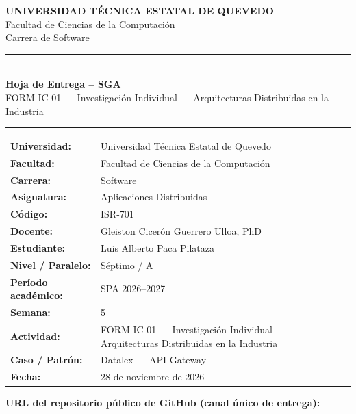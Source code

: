 \documentclass[11pt,a4paper]{article}
\begin{document}
\vspace*{1.0cm}

\begin{center}
  {\Large \textbf{UNIVERSIDAD T\'ECNICA ESTATAL DE QUEVEDO}}\\[0.2cm]
  {\large Facultad de Ciencias de la Computaci\'on}\\[0.15cm]
  {\large Carrera de Software}\\[0.8cm]
  \rule{\textwidth}{0.8pt}\\[0.4cm]
  {\LARGE \textbf{Hoja de Entrega -- SGA}}\\[0.2cm]
  {\large FORM-IC-01 --- Investigaci\'on Individual --- Arquitecturas Distribuidas en la Industria}\\[0.2cm]
  \rule{\textwidth}{0.8pt}
\end{center}

\vspace{0.8cm}

\begin{center}
\renewcommand{\arraystretch}{1.32}
\begin{tabular}{@{}p{4.8cm}p{11.6cm}@{}}
  \toprule
  \textbf{Universidad:}           & Universidad T\'ecnica Estatal de Quevedo \\
  \textbf{Facultad:}              & Facultad de Ciencias de la Computaci\'on \\
  \textbf{Carrera:}               & Software \\
  \textbf{Asignatura:}            & Aplicaciones Distribuidas \\
  \textbf{C\'odigo:}              & ISR-701 \\
  \textbf{Docente:}               & Gleiston Cicer\'on Guerrero Ulloa, PhD \\
  \textbf{Estudiante:}            & Luis Alberto Paca Pilataza \\
  \textbf{Nivel / Paralelo:}      & S\'eptimo / A \\
  \textbf{Per\'iodo acad\'emico:} & SPA 2026--2027 \\
  \textbf{Semana:}                & 5 \\
  \textbf{Actividad:}             & FORM-IC-01 --- Investigaci\'on Individual --- Arquitecturas Distribuidas en la Industria \\
  \textbf{Caso / Patr\'on:}       & Datalex --- API Gateway \\
  \textbf{Fecha:}                 & 28 de noviembre de 2026 \\
  \bottomrule
\end{tabular}
\end{center}

\vspace{0.9cm}

\noindent\textbf{URL del repositorio p\'ublico de GitHub (canal \'unico de entrega):}

\vspace{0.35cm}

\begin{center}
\end{center}
\end{document}
